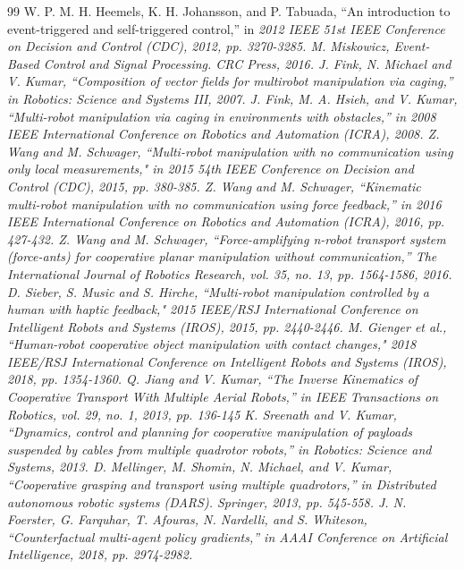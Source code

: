 \documentclass[letterpaper, 10 pt, conference]{ieeeconf} %
\begin{document}
\begin{thebibliography}{99}
 W. P. M. H. Heemels, K. H. Johansson, and P. Tabuada, “An introduction to event-triggered and self-triggered control,” in \it{}2012 IEEE 51st IEEE Conference on Decision and Control (CDC)\rm{}, 2012, pp. 3270-3285.
 M. Miskowicz, \it{Event-Based Control and Signal Processing}. \rm{}CRC Press, 2016.
 J. Fink, N. Michael and V. Kumar, “Composition of vector fields for multirobot manipulation via caging,” in \it{}Robotics: Science and Systems III\rm{}, 2007. 
 J. Fink, M. A. Hsieh, and V. Kumar, “Multi-robot manipulation via caging in environments with obstacles,” in \it{}2008 IEEE International Conference on Robotics and Automation (ICRA)\rm{}, 2008.
 Z. Wang and M. Schwager, “Multi-robot manipulation with no communication using only local measurements," in \it{}2015 54th IEEE Conference on Decision and Control (CDC)\rm{}, 2015, pp. 380-385.
 Z. Wang and M. Schwager, “Kinematic multi-robot manipulation with no communication using force feedback,” in \it{}2016 IEEE International Conference on Robotics and Automation (ICRA)\rm{}, 2016, pp. 427-432.
 Z. Wang and M. Schwager, “Force-amplifying n-robot transport system (force-ants) for cooperative planar manipulation without communication,” \it{}The International Journal of Robotics Research\rm{}, vol. 35, no. 13, pp. 1564-1586, 2016.
 D. Sieber, S. Music and S. Hirche, “Multi-robot manipulation controlled by a human with haptic feedback," \it{}2015 IEEE/RSJ International Conference on Intelligent Robots and Systems (IROS)\rm{}, 2015, pp. 2440-2446.
 M. Gienger et al., “Human-robot cooperative object manipulation with contact changes," \it{}2018 IEEE/RSJ International Conference on Intelligent Robots and Systems (IROS)\rm{}, 2018, pp. 1354-1360.
 Q. Jiang and V. Kumar, “The Inverse Kinematics of Cooperative Transport With Multiple Aerial Robots,” in \it{}IEEE Transactions on Robotics\rm{}, vol. 29, no. 1, 2013, pp. 136-145
 K. Sreenath and V. Kumar, “Dynamics, control and planning for cooperative manipulation of payloads suspended by cables from multiple quadrotor robots,” in \it{}Robotics: Science and Systems\rm{}, 2013.
 D. Mellinger, M. Shomin, N. Michael, and V. Kumar, “Cooperative grasping and transport using multiple quadrotors,” in \it{}Distributed autonomous robotic systems (DARS)\rm{}. Springer, 2013, pp. 545-558.
 J. N. Foerster, G. Farquhar, T. Afouras, N. Nardelli, and S. Whiteson, “Counterfactual multi-agent policy gradients,” in \it{}AAAI Conference on Artificial Intelligence\rm{}, 2018, pp. 2974-2982.

\end{thebibliography}
\end{document}

